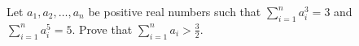 Let $a_1, a_2,\ldots , a_n$ be positive real numbers such that $\sum_{i=1}^na_i^3=3$ and $\sum_{i=1}^na_i^5=5$. Prove that $\sum_{i=1}^na_i>\frac{3}{2}$.